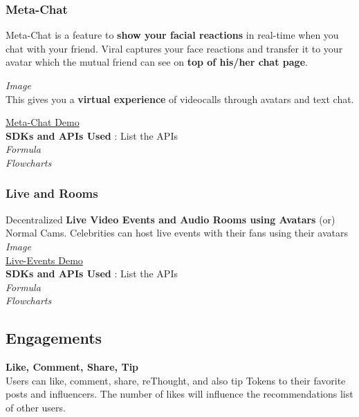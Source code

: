 \documentclass[10pt]{article}
\begin{document}
\subsubsection{Meta-Chat}

Meta-Chat is a feature to \textbf{show your facial reactions} in real-time when you chat with your friend. Viral captures your face reactions and transfer it to your avatar which the mutual friend can see on \textbf{top of his/her chat page}.

\textit{Image}\\

This gives you a \textbf{virtual experience} of videocalls through avatars and text chat.

\hyperlink{https://sample.com}{Meta-Chat Demo}\\

\textbf{SDKs and APIs Used} : List the APIs\\

\textit{Formula\\
Flowcharts}

\subsubsection{Live and Rooms}

Decentralized \textbf{Live Video Events and Audio Rooms using Avatars} (or) Normal Cams. Celebrities can host live events with their fans using their avatars\\

\textit{Image}\\
\hyperlink{https://sample.com}{Live-Events Demo}\\

\textbf{SDKs and APIs Used} : List the APIs\\

\textit{Formula\\
Flowcharts}

\subsection{Engagements}

\textbf{Like, Comment, Share, Tip}\\

Users can like, comment, share, reThought, and also tip Tokens to their favorite posts and influencers. The number of likes will influence the recommendations list of other users.\\
\end{document}
